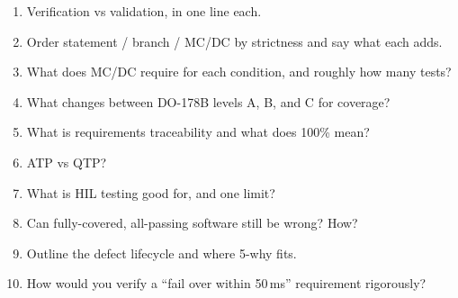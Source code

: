 \begin{scorecard}
\begin{enumerate}
\item Verification vs validation, in one line each.
\item Order statement / branch / MC/DC by strictness and say what each adds.
\item What does MC/DC require for each condition, and roughly how many tests?
\item What changes between DO-178B levels A, B, and C for coverage?
\item What is requirements traceability and what does 100\% mean?
\item ATP vs QTP?
\item What is HIL testing good for, and one limit?
\item Can fully-covered, all-passing software still be wrong? How?
\item Outline the defect lifecycle and where 5-why fits.
\item How would you verify a ``fail over within 50\,ms'' requirement rigorously?
\end{enumerate}
\end{scorecard}

